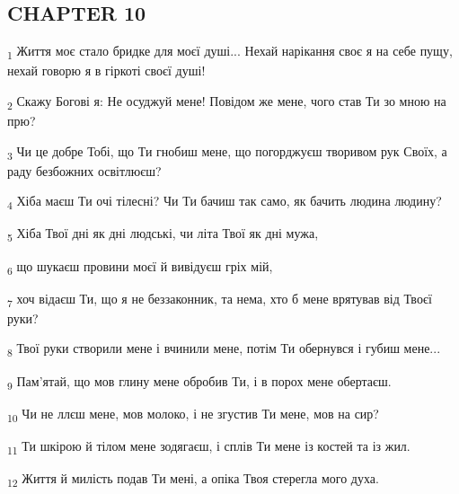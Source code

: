 \subsection{CHAPTER 10}
\begin{tcolorbox}
\textsubscript{1} Життя моє стало бридке для моєї душі... Нехай нарікання своє я на себе пущу, нехай говорю я в гіркоті своєї душі!
\end{tcolorbox}
\begin{tcolorbox}
\textsubscript{2} Скажу Богові я: Не осуджуй мене! Повідом же мене, чого став Ти зо мною на прю?
\end{tcolorbox}
\begin{tcolorbox}
\textsubscript{3} Чи це добре Тобі, що Ти гнобиш мене, що погорджуєш творивом рук Своїх, а раду безбожних освітлюєш?
\end{tcolorbox}
\begin{tcolorbox}
\textsubscript{4} Хіба маєш Ти очі тілесні? Чи Ти бачиш так само, як бачить людина людину?
\end{tcolorbox}
\begin{tcolorbox}
\textsubscript{5} Хіба Твої дні як дні людські, чи літа Твої як дні мужа,
\end{tcolorbox}
\begin{tcolorbox}
\textsubscript{6} що шукаєш провини моєї й вивідуєш гріх мій,
\end{tcolorbox}
\begin{tcolorbox}
\textsubscript{7} хоч відаєш Ти, що я не беззаконник, та нема, хто б мене врятував від Твоєї руки?
\end{tcolorbox}
\begin{tcolorbox}
\textsubscript{8} Твої руки створили мене і вчинили мене, потім Ти обернувся і губиш мене...
\end{tcolorbox}
\begin{tcolorbox}
\textsubscript{9} Пам'ятай, що мов глину мене обробив Ти, і в порох мене обертаєш.
\end{tcolorbox}
\begin{tcolorbox}
\textsubscript{10} Чи не ллєш мене, мов молоко, і не згустив Ти мене, мов на сир?
\end{tcolorbox}
\begin{tcolorbox}
\textsubscript{11} Ти шкірою й тілом мене зодягаєш, і сплів Ти мене із костей та із жил.
\end{tcolorbox}
\begin{tcolorbox}
\textsubscript{12} Життя й милість подав Ти мені, а опіка Твоя стерегла мого духа.
\end{tcolorbox}

